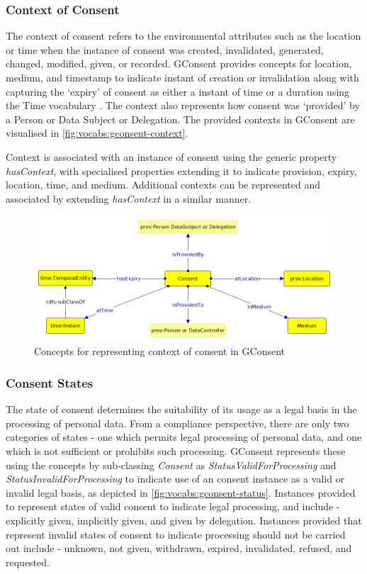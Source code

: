 \subsubsection{Context of Consent}
The context of consent refers to the environmental attributes such as the location or time when the instance of consent was created, invalidated, generated, changed, modified, given, or recorded.
GConsent provides concepts for location, medium, and timestamp to indicate instant of creation or invalidation along with capturing the `expiry' of consent as either a instant of time or a duration using the Time vocabulary \cite{}. The context also represents how consent was `provided' by a Person or Data Subject or Delegation. 
The provided contexts in GConsent are visualised in \autoref{fig:vocabs:gconsent-context}.

Context is associated with an instance of consent using the generic property \textit{hasContext}, with specialised properties extending it to indicate provision, expiry, location, time, and medium. 
Additional contexts can be represented and associated by extending \textit{hasContext} in a similar manner.
\begin{figure}[htbp]
    \centering
    \includegraphics[width=0.8\linewidth]{img/gconsent_context.png}
    \caption{Concepts for representing context of consent in GConsent \cite{}}
    \label{fig:vocabs:gconsent-context}
\end{figure}

\subsubsection{Consent States}
The state of consent determines the suitability of its usage as a legal basis in the processing of personal data.
From a compliance perspective, there are only two categories of states - one which permits legal processing of personal data, and one which is not sufficient or prohibits such processing.
GConsent represents these using the concepts by sub-classing \textit{Consent} as \textit{StatusValidForProcessing} and \textit{StatusInvalidForProcessing} to indicate use of an consent instance as a valid or invalid legal basis, as depicted in \autoref{fig:vocabs:gconsent-status}.
Instances provided to represent states of valid consent to indicate legal processing, and include - explicitly given, implicitly given, and given by delegation.
Instances provided that represent invalid states of consent to indicate processing should not be carried out include - unknown, not given, withdrawn, expired, invalidated, refused, and requested.

